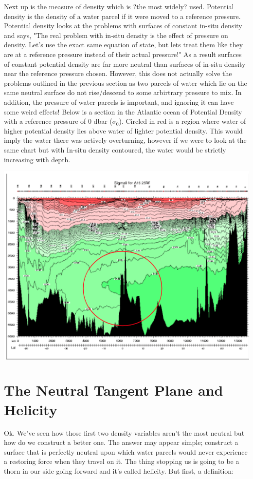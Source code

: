 \documentclass[11pt]{article}
\begin{document}
Next up is the measure of density which is ?the most widely? used. Potential density is the density of a water parcel if it were moved to a reference pressure. Potential density looks at the problems with surfaces of constant in-situ density and says, "The real problem with in-situ density is the effect of pressure on density. Let's use the exact same equation of state, but lets treat them like they are at a reference pressure instead of their actual pressure!" As a result surfaces of constant potential density are far more neutral than surfaces of in-situ density near the reference pressure chosen. However, this does not actually solve the problems outlined in the previous section as two parcels of water which lie on the same neutral surface do not rise/descend to some arbirtrary pressure to mix. In addition, the pressure of water parcels is important, and ignoring it can have some weird effects! Below is a section in the Atlantic ocean of Potential Density with a reference pressure of 0 dbar (\(\sigma_0\)). Circled in red is a region where water of higher potential density lies above water of lighter potential density. This would imply the water there was actively overturning, however if we were to  look at the same chart but with In-situ density contoured, the water would be strictly increasing with depth. 
\begin{center}
\includegraphics[width=.9\linewidth]{Potential_density/2021-05-01_15-28-04_densinversion.png}
\end{center}

\section{The Neutral Tangent Plane and Helicity}
\label{sec:org2395a0b}
Ok. We've seen how those first two density variables aren't the most neutral but how do we construct a better one. The answer may appear simple; construct a surface that is perfectly neutral upon which water parcels would never experience a restoring force when they travel on it. The thing stopping us is going to be a thorn in our side going forward and it's called helicity. But first, a definition:
\end{document}

